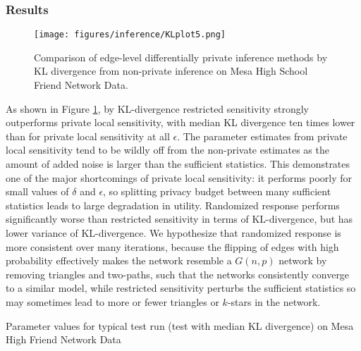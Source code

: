   \subsubsection{Results}
  
   \begin{figure}[h]
  	\caption{Comparison of edge-level differentially private inference methods by KL divergence from non-private inference on Mesa High School Friend Network Data.}
  	\centering
  	\texttt{[image: figures/inference/KLplot5.png]}
  	\label{fig:kledgepub}
  \end{figure}
  
  As shown in Figure \ref{fig:kledgepub}, by KL-divergence restricted sensitivity strongly outperforms private local sensitivity, with median KL divergence ten times lower than for private local sensitivity at all $\epsilon$. The parameter estimates from private local sensitivity tend to be wildly off from the non-private estimates as the amount of added noise is larger than the sufficient statistics. This demonstrates one of the major shortcomings of private local sensitivity: it performs poorly for small values of $\delta$ and $\epsilon$, so splitting privacy budget between many sufficient statistics leads to large degradation in utility. Randomized response performs significantly worse than restricted sensitivity in terms of KL-divergence, but has lower variance of KL-divergence. We hypothesize that randomized response is more consistent over many iterations, because the flipping of edges with high probability effectively makes the network resemble a $G(n,p)$ network by removing triangles and two-paths, such that the networks consistently converge to a similar model, while restricted sensitivity perturbs the sufficient statistics so may sometimes lead to more or fewer triangles or $k$-stars in the network. 
  
    \begin{table}[h]
  	\caption{Parameter values for typical test run (test with median KL divergence) on Mesa High Friend Network Data} 
  	\label{tab:typparamsedge}
  	\centering
  	
  \end{table}
  
